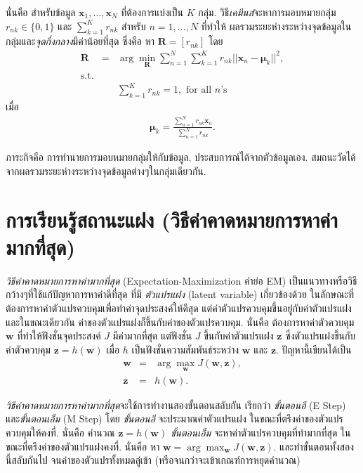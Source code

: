 นั่นคือ สำหรับข้อมูล $\bm{x}_1, \ldots, \bm{x}_N$ ที่ต้องการแบ่งเป็น $K$ กลุ่ม.
วิธี\textit{เคมีนส์}จะหาการมอบหมายกลุ่ม $r_{nk} \in \{0, 1\}$
และ $\sum_{k=1}^K r_{nk}$ สำหรับ $n = 1, \ldots, N$
ที่ทำให้
ผลรวมระยะห่างระหว่างจุดข้อมูลในกลุ่มและ\textit{จุดกึ่งกลาง}มีค่าน้อยที่สุด
ซึ่งคือ หา $\bm{R} = [r_{nk}]$ โดย
\begin{eqnarray}
\bm{R} &=& \arg\min_{\bm{R}} \sum_{n=1}^N \sum_{k=1}^K r_{nk} || \bm{x}_n - \bm{\mu}_k ||^2
\label{eq: opt K-means obj}, \\
\mbox{s.t.} &\;& 
\nonumber \\
&\;& \sum_{k=1}^K r_{nk} = 1, \mbox{ for all } n\mbox{'s}
\nonumber
\end{eqnarray}
เมื่อ
\begin{eqnarray}
\bm{\mu}_k = \frac{\sum_{n=1}^N r_{nk} \bm{x}_n}{\sum_{n=1}^N r_{nk}}
\label{eq: opt K-means centroid}.
\end{eqnarray}

ภาระกิจคือ การทำนายการมอบหมายกลุ่มให้กับข้อมูล.
ประสบการณ์ได้จากตัวข้อมูลเอง.
สมถนะวัดได้จากผลรวมระยะห่างระหว่างจุดข้อมูลต่างๆในกลุ่มเดียวกัน.

\section{การเรียนรู้สถานะแฝง (วิธีค่าคาดหมายการหาค่ามากที่สุด)}

\textit{วิธีค่าคาดหมายการหาค่ามากที่สุด} (Expectation-Maximization คำย่อ EM) เป็นแนวทางหรือวิธีกว้างๆที่ใช้แก้ปัญหาการหาค่าดีที่สุด 
ที่มี
\textit{ตัวแปรแฝง} (latent variable) เกี่ยวข้องด้วย
ในลักษณะที่ ต้องการหาค่าตัวแปรควบคุมเพื่อทำค่าจุดประสงค์ให้ดีสุด 
แต่ค่าตัวแปรควบคุมขึ้นอยู่กับค่าตัวแปรแฝง 
และในขณะเดียวกัน ค่าของตัวแปรแฝงก็ขึ้นกับค่าของตัวแปรควบคุม.
นั่นคือ ต้องการหาค่าตัวควบคุม $\bm{w}$ ที่ทำให้ฟังชั่นจุดประสงค์ $J$ มีค่ามากที่สุด แต่ฟังชั่น $J$ ขึ้นกับค่าตัวแปรแฝง $\bm{z}$ ซึ่งตัวแปรแฝงขึ้นกับค่าตัวควบคุม $\bm{z} = h(\bm{w})$
เมื่อ $h$ เป็นฟังชั่นความสัมพันธ์ระหว่าง $\bm{w}$ และ $\bm{z}$.
ปัญหานี้เขียนได้เป็น
\begin{eqnarray}
\bm{w} &=& \arg\max_{\bm{w}} J(\bm{w}, \bm{z})
\label{eq: opt EM obj}, \\
\bm{z} &=& h(\bm{w})
\label{eq: opt EM dependent}.
\end{eqnarray}

\textit{วิธีค่าคาดหมายการหาค่ามากที่สุด}จะใช้การทำงานสองขั้นตอนสลับกัน เรียกว่า \textit{ขั้นตอนอี} (E Step) และ\textit{ขั้นตอนเอ็ม} (M Step)
โดย
\textit{ขั้นตอนอี} จะประมาณค่าตัวแปรแฝง ในขณะที่ตรึงค่าของตัวแปรควบคุมให้คงที่.
นั่นคือ คำนวณ $\bm{z} = h(\bm{w})$
\textit{ขั้นตอนเอ็ม} จะหาค่าตัวแปรควบคุมที่ทำมากที่สุด 
ในขณะที่ตรึงค่าของตัวแปรแฝงคงที่.
นั่นคือ หา $\bm{w} = \arg\max_{\bm{w}} J(\bm{w}, \bm{z})$.
และทำขั้นตอนทั้งสองนี้สลับกันไป จนค่าของตัวแปรทั้งหมดลู่เข้า (หรือจนกว่าจะเข้าเกณฑ์การหยุดคำนวณ)

